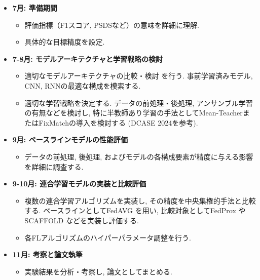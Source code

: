 \documentclass[dvipdfmx, twocolumn, 10pt]{bxjsarticle}
\begin{document}
\begin{itemize}
    \item \textbf{7月: 準備期間}
    \begin{itemize}
        \item 評価指標（F1スコア, PSDSなど）の意味を詳細に理解.
        \item 具体的な目標精度を設定.
    \end{itemize}
    
    \item \textbf{7-8月: モデルアーキテクチャと学習戦略の検討}
    \begin{itemize}
        \item 適切なモデルアーキテクチャの比較・検討 \cite{li2022hybrid,schmid2024multi} を行う. 事前学習済みモデル, CNN, RNNの最適な構成を模索する.
        \item 適切な学習戦略を決定する. データの前処理・後処理, アンサンブル学習の有無などを検討し, 特に半教師あり学習の手法としてMean-TeacherまたはFixMatchの導入を検討する (DCASE 2024を参考).
    \end{itemize}
    
    \item \textbf{9月: ベースラインモデルの性能評価}
    \begin{itemize}
        \item データの前処理, 後処理, およびモデルの各構成要素が精度に与える影響を詳細に調査する.
    \end{itemize}

    \item \textbf{9-10月: 連合学習モデルの実装と比較評価}
    \begin{itemize}
        \item 複数の連合学習アルゴリズムを実装し, その精度を中央集権的手法と比較する. ベースラインとしてFedAVG \cite{mcmahan2017communication} を用い, 比較対象としてFedProx \cite{li2020federated} や SCAFFOLD \cite{karimireddy2020scaffold} などを実装し評価する.
        \item 各FLアルゴリズムのハイパーパラメータ調整を行う.
    \end{itemize}
    
    \item \textbf{11月: 考察と論文執筆}
    \begin{itemize}
        \item 実験結果を分析・考察し, 論文としてまとめる.
    \end{itemize}
\end{itemize}
\end{document}

